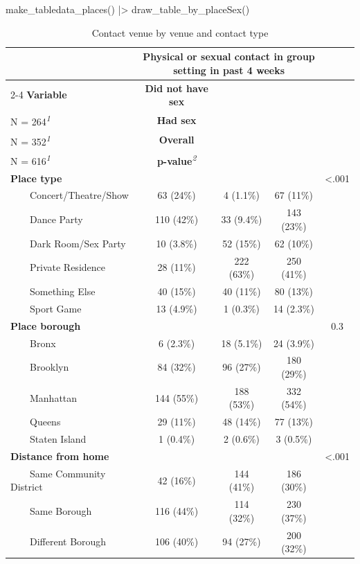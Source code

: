 \documentclass[
  letterpaper,
  DIV=11,
  numbers=noendperiod,
  oneside]{scrreprt}
\newenvironment{Shaded}{\begin{snugshade}}{\end{snugshade}}
\newcommand{\FunctionTok}[1]{\textcolor[rgb]{0.28,0.35,0.67}{#1}}
\newcommand{\NormalTok}[1]{\textcolor[rgb]{0.00,0.23,0.31}{#1}}
\newcommand{\SpecialCharTok}[1]{\textcolor[rgb]{0.37,0.37,0.37}{#1}}
\begin{document}
\begin{Shaded}
\begin{Highlighting}[]
\FunctionTok{make\_tabledata\_places}\NormalTok{() }\SpecialCharTok{|\textgreater{}}
        \FunctionTok{draw\_table\_by\_placeSex}\NormalTok{()}
\end{Highlighting}
\end{Shaded}

\hypertarget{tbl-places-descriptives}{}
\setlength{\LTpost}{0mm}
\begin{longtable}{lcccc}
\caption{\label{tbl-places-descriptives}Contact venue by venue and contact type }\tabularnewline

\toprule
 & \multicolumn{3}{c}{\textbf{Physical or sexual contact in group setting in past 4 weeks}} &  \\ 
\cmidrule(lr){2-4}
\textbf{Variable} & \textbf{Did not have sex}\\
N = 264\textsuperscript{\textit{1}} & \textbf{Had sex}\\
N = 352\textsuperscript{\textit{1}} & \textbf{Overall}\\
N = 616\textsuperscript{\textit{1}} & \textbf{p-value}\textsuperscript{\textit{2}} \\ 
\midrule\addlinespace[2.5pt]
\textbf{Place type} &  &  &  & <.001 \\ 
    Concert/Theatre/Show & 63 (24\%) & 4 (1.1\%) & 67 (11\%) &  \\ 
    Dance Party & 110 (42\%) & 33 (9.4\%) & 143 (23\%) &  \\ 
    Dark Room/Sex Party & 10 (3.8\%) & 52 (15\%) & 62 (10\%) &  \\ 
    Private Residence & 28 (11\%) & 222 (63\%) & 250 (41\%) &  \\ 
    Something Else & 40 (15\%) & 40 (11\%) & 80 (13\%) &  \\ 
    Sport Game & 13 (4.9\%) & 1 (0.3\%) & 14 (2.3\%) &  \\ 
\textbf{Place borough} &  &  &  & 0.3 \\ 
    Bronx & 6 (2.3\%) & 18 (5.1\%) & 24 (3.9\%) &  \\ 
    Brooklyn & 84 (32\%) & 96 (27\%) & 180 (29\%) &  \\ 
    Manhattan & 144 (55\%) & 188 (53\%) & 332 (54\%) &  \\ 
    Queens & 29 (11\%) & 48 (14\%) & 77 (13\%) &  \\ 
    Staten Island & 1 (0.4\%) & 2 (0.6\%) & 3 (0.5\%) &  \\ 
\textbf{Distance from home} &  &  &  & <.001 \\ 
    Same Community District & 42 (16\%) & 144 (41\%) & 186 (30\%) &  \\ 
    Same Borough & 116 (44\%) & 114 (32\%) & 230 (37\%) &  \\ 
    Different Borough & 106 (40\%) & 94 (27\%) & 200 (32\%) &  \\ 
\bottomrule
\end{longtable}
\end{document}
